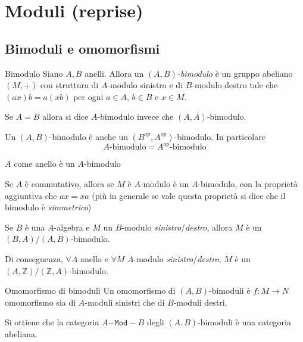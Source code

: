 \chapter{Moduli (reprise)}

\section{Bimoduli e omomorfismi}
\begin{definition}{Bimodulo}
    Siano \(A, B\) anelli. Allora un \({(A,B)}\)\emph{-bimodulo} è un gruppo abeliano
    \({(M, +)}\) con struttura di \(A\)-modulo sinistro e di \(B\)-modulo destro
    tale che \( {(ax)}b = a{(xb)}\) per ogni \(a \in A \), \(b \in B\) e \(x \in
    M\).

    Se \(A=B\) allora si dice \(A\)-bimodulo invece che \({(A,A)}\)-bimodulo.
\end{definition}
\begin{remark}{}
    Un \({(A,B)}\)-bimodulo è anche un \({(B^{op}, A^{op})}\)-bimodulo. In
    particolare
    \[
      A\text{-bimodulo} = A^{op}\text{-bimodulo}
    \]
\end{remark}
\begin{example}{}
    \(A\) come anello è un \(A\)-bimodulo
\end{example}
\begin{example}{}
    Se \(A\) è commutativo, allora se \(M\) è \(A\)-modulo è un \(A\)-bimodulo,
    con la proprietà aggiuntiva che \(ax = xa\) (più in generale se vale questa
    proprietà si dice che il bimodulo è \emph{simmetrico})
\end{example}
\begin{example}{}
    Se \(B\) è una \(A\)-algebra e \(M\) un \(B\)-modulo
    \emph{sinistro}/\emph{destro}, allora \(M\) è un
    \({(B,A)}/{(A,B)}\)-bimodulo.

    Di conseguenza, \(\forall A\) anello e \(\forall M\) \(A\)-modulo
    \emph{sinistro}/\emph{destro}, \(M\) è un
    \({(A,\mathbb{Z})}/{(\mathbb{Z},A)}\)-bimodulo.
\end{example}

\begin{definition}{Omomorfismo di bimoduli}
    Un omomorfismo di \({(A,B)}\)-bimoduli è \(f : M \to N\) omomorfismo sia di
    \(A\)-moduli sinistri che di \(B\)-moduli destri.
\end{definition}

Si ottiene che la categoria \(A\mathtt{-Mod-}B\) degli \({(A,B)}\)-bimoduli è
una categoria abeliana.


